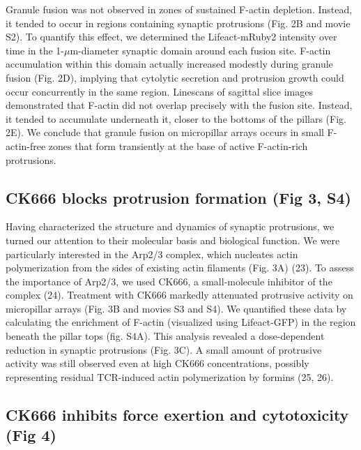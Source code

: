 
Granule fusion was not observed in zones of sustained F-actin depletion. Instead, it tended to occur in regions containing synaptic protrusions (Fig. 2B and movie S2). To quantify this effect, we determined the Lifeact-mRuby2 intensity over time in the 1-$\mu$m-diameter synaptic domain around each fusion site. F-actin accumulation within this
domain actually increased modestly during granule fusion (Fig. 2D), implying that cytolytic secretion and protrusion growth could occur concurrently in the same region. Linescans of sagittal slice images demonstrated that F-actin did not overlap precisely with the fusion site. Instead, it tended to accumulate underneath it, closer to the bottoms of the pillars (Fig. 2E). We conclude that granule fusion on micropillar arrays occurs in small F-actin-free zones that form transiently at the base of active F-actin-rich protrusions.

\subsection{CK666 blocks protrusion formation (Fig 3, S4)}

Having characterized the structure and dynamics of synaptic protrusions, we turned our attention to their molecular basis and biological function. We were particularly interested in the Arp2/3 complex, which nucleates actin polymerization from the sides of existing actin filaments (Fig. 3A) (23). To assess the importance of Arp2/3, we used CK666, a small-molecule inhibitor of the complex (24). Treatment with CK666 markedly attenuated protrusive activity on
micropillar arrays (Fig. 3B and movies S3 and S4). We quantified these data by calculating the enrichment of F-actin (visualized using Lifeact-GFP) in the region beneath the pillar tops (fig. S4A). This analysis revealed a dose-dependent reduction in synaptic protrusions (Fig. 3C). A small amount of protrusive activity was still observed even at high CK666 concentrations, possibly representing residual TCR-induced actin polymerization by formins (25, 26).

\subsection{CK666 inhibits force exertion and cytotoxicity (Fig 4)}

